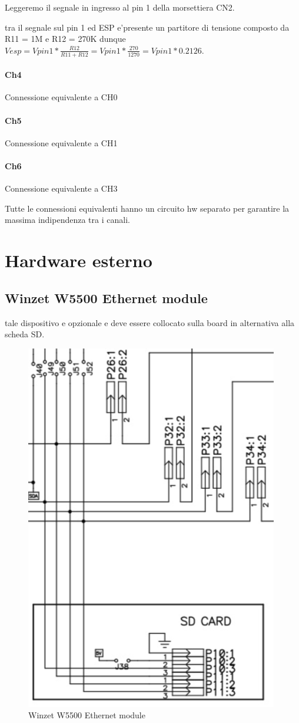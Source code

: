 \documentclass[12pt,a4paper]{report}
\begin{document}
Leggeremo il segnale in ingresso al pin 1 della morsettiera CN2.

tra il segnale sul pin 1 ed ESP e'presente un partitore di tensione composto da R11 = 1M e R12 = 270K dunque $Vesp = Vpin1 * \frac{R12}{R11+R12} = Vpin1 * \frac{270}{1270} = Vpin1 * 0.2126$.


\paragraph{Ch4}
Connessione equivalente a CH0 

\paragraph{Ch5}
Connessione equivalente a CH1

\paragraph{Ch6}
Connessione equivalente a CH3

Tutte le connessioni equivalenti hanno un circuito hw separato per garantire la massima indipendenza tra i canali.
\section{ Hardware esterno }

\subsection{Winzet W5500 Ethernet module}
tale dispositivo e opzionale e deve essere collocato sulla board in alternativa alla scheda SD.

\begin{figure}[H]
    \centering
    \includegraphics[width=0.7\linewidth]{../image/SD_and_W5500.png}
    \caption{Winzet W5500 Ethernet module}
\end{figure}
\end{document}
